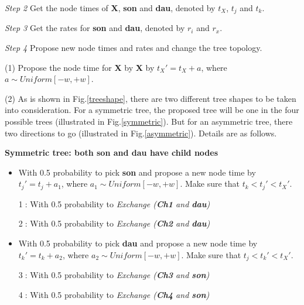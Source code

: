 \documentclass{bmcart}
\begin{document}
\emph{Step 2} Get the node times of \textbf{X}, \textbf{son} and \textbf{dau}, denoted by $t_X$, $t_j$ and $t_k$.

\emph{Step 3} Get the rates for \textbf{son} and \textbf{dau}, denoted by $r_i$ and $r_x$.

\emph{Step 4} Propose new node times and rates and change the tree topology.

(1) Propose the node time for \textbf{X} by \textbf{X} by ${t_X}' = {t_X} + a$, where $a \sim Uniform[ - w, + w]$. 

(2) As is shown in Fig.\ref{treeshape}, there are two different tree shapes to be taken into consideration. For a symmetric tree, the proposed tree will be one in the four possible trees (illustrated in Fig.\ref{symmetric}). But for an asymmetric tree, there two directions to go (illustrated in Fig.\ref{asymmetric}). Details are as follows.

\textbf{Symmetric tree: both \textbf{son} and \textbf{dau} have child nodes}
\begin{itemize}
\item With 0.5 probability to pick  \textbf{son} and propose a new node time by ${t_j}' = {t_j} + {a_1}$, where ${a_1} \sim Uniform[ - w, + w]$. Make sure that ${t_k} < {t_j}' < {t_X}'$.

\textcircled1: With 0.5 probability to \textit{Exchange (\textbf{Ch1} and \textbf{dau})}

\textcircled2: With 0.5 probability to \textit{Exchange (\textbf{Ch2} and \textbf{dau})}

\item With 0.5 probability to pick \textbf{dau} and propose a new node time by ${t_k}' = {t_k} + {a_2}$, where ${a_2} \sim Uniform[ - w, + w]$. Make sure that ${t_j} < {t_k}' < {t_X}'$.

\textcircled3: With 0.5 probability to \textit{Exchange (\textbf{Ch3} and \textbf{son})}

\textcircled4: With 0.5 probability to \textit{Exchange (\textbf{Ch4} and \textbf{son})}
\end{itemize}
\end{document}
